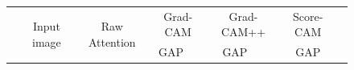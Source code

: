 \begin{figure}[t]
\scriptsize
\centering
\setlength{\tabcolsep}{1.5pt}
\begin{tabular}{ccccccccc}
	{}&\multirow{2}{*}{Input image}&\multirow{2}{*}{Raw Attention}&\multicolumn{2}{c}{Grad-CAM}&\multicolumn{2}{c}{Grad-CAM++}&\multicolumn{1}{c}{Score-CAM}\\
	{}&{}&{}&GAP&\Ours&GAP&\Ours&GAP&\Ours\\


\end{tabular}
\end{figure}
